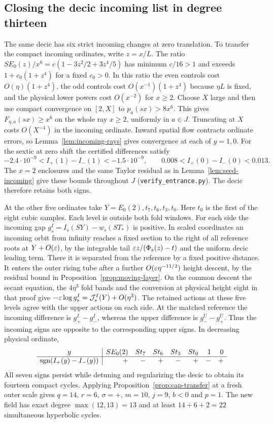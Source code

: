 \subsection{Closing the decic incoming list in degree thirteen}
The same decic has six strict incoming changes at zero translation.
To transfer the compact incoming ordinates, write $z=x/L$. The ratio
$SE_0(z)/x^6=c(1-3z^2/2+3z^4/5)$ has minimum $c/16>1$ and exceeds
$1+c_0(1+z^4)$ for a fixed $c_0>0$. In this ratio the even controls
cost $O(\eta)(1+z^4)$, the odd controls cost $O(x^{-1})(1+z^4)$
because $\eta L$ is fixed, and the physical lower powers cost $O(x^{-2})$
for $x\ge2$. Choose $X$ large and then use compact convergence on $[2,X]$
to $p_a(sx)>8x^6$. This gives $F_{\eta,a}(sx)\ge x^6$ on the whole
ray $x\ge2$, uniformly in $a\in J$. Truncating at $X$ costs $O(X^{-4})$
in the incoming ordinate. Inward spatial flow contracts ordinate errors,
so Lemma~\ref{lem:incoming-rays} gives convergence at each of $y=1,0$.
For the sextic at zero shift the certified differences satisfy
\[
 -2.4\cdot10^{-9}<I_+(1)-I_-(1)<-1.5\cdot10^{-9},
 \qquad 0.008<I_+(0)-I_-(0)<0.013 .
\]
The $x=2$ enclosures and the same Taylor residual as in
Lemma~\ref{lem:seed-incoming} give these bounds throughout $J$
(\texttt{verify\_entrance.py}). The decic therefore retains both signs.

At the other five ordinates take $Y=E_0(2),t_7,t_6,t_3,t_0$.
Here $t_0$ is the first of the eight cubic samples.
Each level is outside both fold windows. For each side the incoming
gap $g_s^I=I_s(SY)-w_s(ST_*)$ is positive. In scaled coordinates
an incoming orbit from infinity reaches a fixed section to the right of
all reference roots at $Y+O(\varepsilon)$, by the integrable tail
$\varepsilon z/(\Phi_s(z)-t)$ and the uniform decic leading term.
There it is separated from the reference by a fixed positive distance.
It enters the outer rising tube after a further $O(\varepsilon\eta^{-11/2})$
height descent, by the residual bound in Proposition~\ref{prop:moving-layer}.
On the common descent the secant equation, the $4\eta^3$ fold bands and
the conversion at physical height eight in that proof give
$-\varepsilon\log g_s^I=\mathcal{J}_s^I(Y)+O(\eta^3)$. The retained actions at these
five levels agree with the upper actions on each side. At the matched
reference the incoming difference is $g_+^I-g_-^I$, whereas the upper
difference is $g_-^U-g_+^U$. Thus the incoming signs are opposite
to the corresponding upper signs. In decreasing physical ordinate,
\[
 \begin{array}{c|rrrrrrr}
 y& SE_0(2)&St_7&St_6&St_3&St_0&1&0\\ \hline
 \operatorname{sgn}(I_+(y)-I_-(y))&+&-&+&-&+&-&+
 \end{array}
\]
All seven signs persist while detuning and regularizing the decic to
obtain its fourteen compact cycles. Applying Proposition~\ref{prop:cap-transfer}
at a fresh outer scale gives $q=14$, $r=6$, $\sigma=+$, $m=10$, $j=9$,
$b<0$ and $p=1$. The new field has exact degree $\max(12,13)=13$
and at least $14+6+2=22$ simultaneous hyperbolic cycles.

